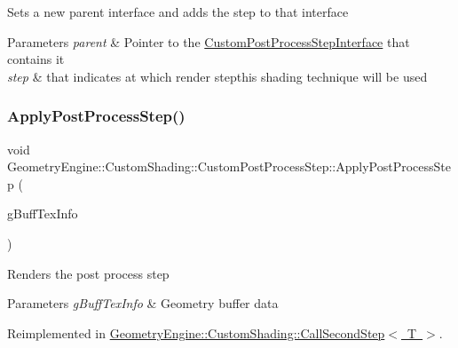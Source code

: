 Sets a new parent interface and adds the step to that interface 
\begin{DoxyParams}{Parameters}
{\em parent} & Pointer to the \mbox{\hyperlink{class_geometry_engine_1_1_custom_shading_1_1_custom_post_process_step_interface}{Custom\+Post\+Process\+Step\+Interface}} that contains it \\
\hline
{\em step} & that indicates at which render stepthis shading technique will be used \\
\hline
\end{DoxyParams}
\mbox{\label{class_geometry_engine_1_1_custom_shading_1_1_custom_post_process_step_a7d3a13a14a98277673dc52c74e38f038}} 
\subsubsection{\texorpdfstring{ApplyPostProcessStep()}{ApplyPostProcessStep()}}
{\footnotesize\ttfamily void Geometry\+Engine\+::\+Custom\+Shading\+::\+Custom\+Post\+Process\+Step\+::\+Apply\+Post\+Process\+Step (\begin{DoxyParamCaption}\item[{const \mbox{\hyperlink{class_geometry_engine_1_1_g_buffer_texture_info}{G\+Buffer\+Texture\+Info}} \&}]{g\+Buff\+Tex\+Info }\end{DoxyParamCaption})\hspace{0.3cm}{\ttfamily [virtual]}}

Renders the post process step 
\begin{DoxyParams}{Parameters}
{\em g\+Buff\+Tex\+Info} & Geometry buffer data \\
\hline
\end{DoxyParams}


Reimplemented in \mbox{\hyperlink{class_geometry_engine_1_1_custom_shading_1_1_call_second_step_af671ca1fc8a0aa5e35309603ddb7da19}{Geometry\+Engine\+::\+Custom\+Shading\+::\+Call\+Second\+Step$<$ T $>$}}.

\mbox{\label{class_geometry_engine_1_1_custom_shading_1_1_custom_post_process_step_af4f29e24fd6b7f13d211f3f3effe40eb}} 
